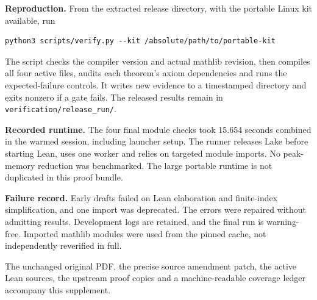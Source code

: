 \documentclass[11pt]{article}
\newcommand{\code}[1]{{\small\nolinkurl{#1}}}
\begin{document}
\textbf{Reproduction.} From the extracted release directory, with the portable Linux kit available, run
\begin{verbatim}
python3 scripts/verify.py --kit /absolute/path/to/portable-kit
\end{verbatim}
The script checks the compiler version and actual mathlib revision, then compiles all four active files, audits each theorem's axiom dependencies and runs the expected-failure controls. It writes new evidence to a timestamped directory and exits nonzero if a gate fails. The released results remain in \code{verification/release_run/}.

\textbf{Recorded runtime.} The four final module checks took 15.654 seconds combined in the warmed session, including launcher setup. The runner releases Lake before starting Lean, uses one worker and relies on targeted module imports. No peak-memory reduction was benchmarked. The large portable runtime is not duplicated in this proof bundle.

\textbf{Failure record.} Early drafts failed on Lean elaboration and finite-index simplification, and one import was deprecated. The errors were repaired without admitting results. Development logs are retained, and the final run is warning-free. Imported mathlib modules were used from the pinned cache, not independently reverified in full.

The unchanged original PDF, the precise source amendment patch, the active Lean sources, the upstream proof copies and a machine-readable coverage ledger accompany this supplement.
\end{document}
